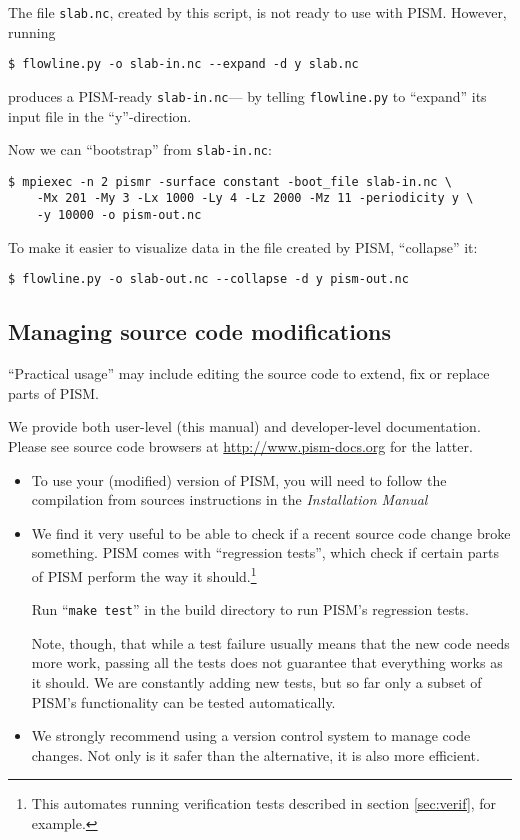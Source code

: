 The file \texttt{slab.nc}, created by this script, is not ready to use with
PISM. However, running
\begin{verbatim}
$ flowline.py -o slab-in.nc --expand -d y slab.nc
\end{verbatim} %
produces  a PISM-ready \texttt{slab-in.nc}--- by telling \texttt{flowline.py} to
``expand'' its input file in the ``y''-direction.

Now we can ``bootstrap'' from \texttt{slab-in.nc}:
\begin{verbatim}
$ mpiexec -n 2 pismr -surface constant -boot_file slab-in.nc \
    -Mx 201 -My 3 -Lx 1000 -Ly 4 -Lz 2000 -Mz 11 -periodicity y \
    -y 10000 -o pism-out.nc
\end{verbatim}%

To make it easier to visualize data in the file created by PISM, ``collapse'' it:
\begin{verbatim}
$ flowline.py -o slab-out.nc --collapse -d y pism-out.nc
\end{verbatim}%

\subsection{Managing source code modifications}
\label{sec:code-modifications}

``Practical usage'' may include editing the source code to extend, fix
or replace parts of PISM.

We provide both user-level (this manual) and developer-level documentation.
Please see source code browsers at \url{http://www.pism-docs.org} for the latter.

\begin{itemize}
\item To use your (modified) version of PISM, you will need to follow the
  compilation from sources instructions in the \emph{Installation Manual}
\item We find it very useful to be able to check if a recent source code change
  broke something. PISM comes with ``regression tests'', which check if certain
  parts of PISM perform the way it should.\footnote{This automates running
    verification tests described in section \ref{sec:verif}, for example.}

  Run ``\texttt{make test}'' in the build directory to run PISM's regression tests.

  Note, though, that while a test failure usually means that the new code needs
  more work, passing all the tests does not guarantee that everything works as
  it should. We are constantly adding new tests, but so far only a subset
  of PISM's functionality can be tested automatically.
\item We strongly recommend using a version control system to manage code
  changes. Not only is it safer than the alternative, it is also more efficient.
\end{itemize}


